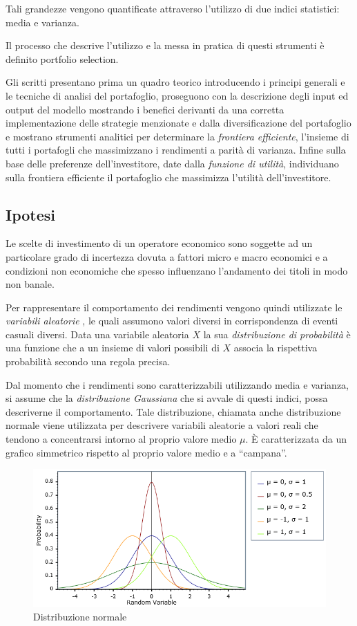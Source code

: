 Tali grandezze vengono quantificate attraverso l'utilizzo di due indici statistici: media e varianza. 

Il processo che descrive l'utilizzo e la messa in pratica di questi strumenti è definito portfolio selection.

Gli scritti presentano prima un quadro teorico introducendo i principi generali e le tecniche di analisi del portafoglio, proseguono con la descrizione degli input ed output del modello mostrando i benefici derivanti da una corretta implementazione delle strategie menzionate e dalla diversificazione del portafoglio e mostrano strumenti analitici per determinare la \textit{frontiera efficiente}, l'insieme di tutti i portafogli che massimizzano i rendimenti a parità di varianza. Infine sulla base delle preferenze dell'investitore, date dalla \textit{funzione di utilità}, individuano sulla frontiera efficiente il portafoglio che massimizza l'utilità dell'investitore. 


\subsection{Ipotesi}

Le scelte di investimento di un operatore economico sono soggette ad un particolare grado di incertezza dovuta a fattori micro e macro economici e a condizioni non economiche che spesso influenzano l'andamento dei titoli in modo non banale. 

Per rappresentare il comportamento dei rendimenti vengono quindi utilizzate le \textit{variabili aleatorie} \cite{noauthor_distribuzione_nodate}, le quali assumono valori diversi in corrispondenza di eventi casuali diversi. Data una variabile aleatoria $X$ la sua \textit{distribuzione di probabilità} è una funzione che a un insieme di valori possibili di $X$ associa la rispettiva probabilità secondo una regola precisa. 

Dal momento che i rendimenti sono caratterizzabili utilizzando media e  varianza, si assume che la \textit{distribuzione Gaussiana} che si avvale di questi indici, possa descriverne il comportamento. Tale distribuzione, chiamata anche distribuzione normale viene utilizzata per descrivere variabili aleatorie a valori reali che tendono a concentrarsi intorno al proprio valore medio $\mu$. \`E caratterizzata da un grafico simmetrico rispetto al proprio valore medio e a “campana”.
\begin{figure} [h!]
	\centering
	\includegraphics[width=0.8\linewidth]{"imgs/normale"}
	\caption{Distribuzione normale \cite{noauthor_normal_nodate}}
	\label{fig:normale}
\end{figure}

